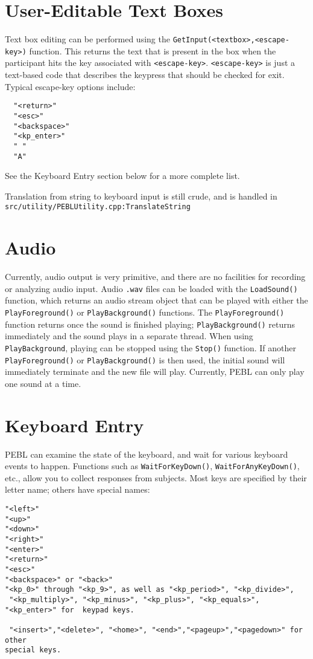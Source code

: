 \section{User-Editable Text Boxes}

Text box editing can be performed using the \verb+GetInput(<textbox>,<escape-key>)+ function.  This returns the text that is present in the box when the participant hits the key associated with \verb+<escape-key>+.  
\verb+<escape-key>+ is just a text-based code that describes the keypress 
that should be checked for exit. Typical escape-key options include:
\begin{verbatim}
  "<return>"
  "<esc>"
  "<backspace>"
  "<kp_enter>"
  " "
  "A"
\end{verbatim}
 
See the Keyboard Entry section below for a more complete list.

Translation from string to keyboard input is still crude, 
and is handled in \texttt{src/utility/PEBLUtility.cpp:TranslateString} 


\section{Audio}

Currently, audio output is very primitive, and there are no facilities for recording or analyzing audio input. Audio \texttt{.wav} files can be loaded with the \texttt{LoadSound()} function, which returns an audio stream object that can be played  with either the \texttt{PlayForeground()} or \texttt{PlayBackground()} functions.  
The \texttt{PlayForeground()} function returns once the sound is finished playing; \texttt{PlayBackground()} returns immediately and the sound plays in a separate thread.  When using \texttt{PlayBackground}, playing can be stopped using the \texttt{Stop()} function.  If another \texttt{PlayForeground()} or \texttt{PlayBackground()} is then used,
the initial sound will immediately terminate and the new file will play. Currently, PEBL can only play one sound at a time.


\section{Keyboard Entry}

PEBL can examine the state of the keyboard, and wait for various
keyboard events to happen. Functions such as
\texttt{WaitForKeyDown()}, \texttt{WaitForAnyKeyDown()}, etc., allow
you to collect responses from subjects. Most keys are specified by
their letter name; others have special names:
\begin{verbatim}
"<left>"
"<up>"
"<down>"
"<right>"
"<enter>"
"<return>"
"<esc>"
"<backspace>" or "<back>"
"<kp_0>" through "<kp_9>", as well as "<kp_period>", "<kp_divide>",
 "<kp_multiply>", "<kp_minus>", "<kp_plus>", "<kp_equals>",
"<kp_enter>" for  keypad keys.

 "<insert>","<delete>", "<home>", "<end>","<pageup>","<pagedown>" for other
special keys.
\end{verbatim}

